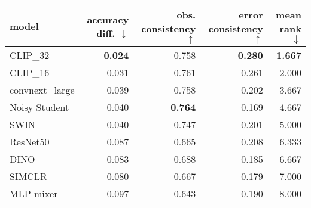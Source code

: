 \begin{tabular}{lrrrr}
\toprule
          model & accuracy diff. $\downarrow$ & obs. consistency $\uparrow$ & error consistency $\uparrow$ & mean rank $\downarrow$ \\
\midrule
       CLIP\_32 &              \textbf{0.024} &                       0.758 &               \textbf{0.280} &         \textbf{1.667} \\
       CLIP\_16 &                       0.031 &                       0.761 &                        0.261 &                  2.000 \\
convnext\_large &                       0.039 &                       0.758 &                        0.202 &                  3.667 \\
  Noisy Student &                       0.040 &              \textbf{0.764} &                        0.169 &                  4.667 \\
           SWIN &                       0.040 &                       0.747 &                        0.201 &                  5.000 \\
       ResNet50 &                       0.087 &                       0.665 &                        0.208 &                  6.333 \\
           DINO &                       0.083 &                       0.688 &                        0.185 &                  6.667 \\
         SIMCLR &                       0.080 &                       0.667 &                        0.179 &                  7.000 \\
      MLP-mixer &                       0.097 &                       0.643 &                        0.190 &                  8.000 \\
\bottomrule
\end{tabular}

